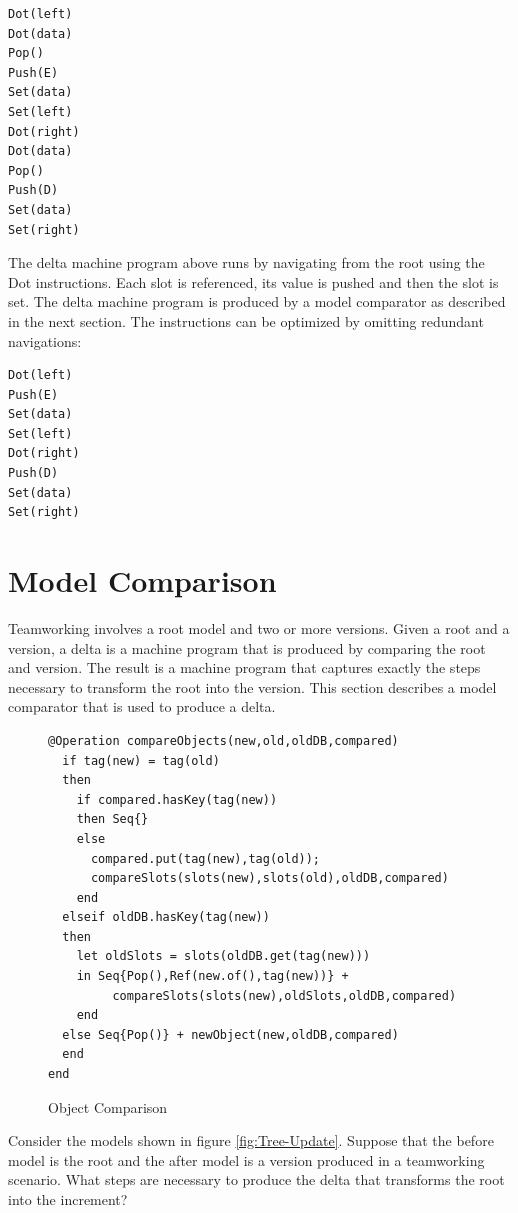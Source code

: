 \begin{lstlisting}
Dot(left)
Dot(data)
Pop()
Push(E)
Set(data)
Set(left)
Dot(right)
Dot(data)
Pop()
Push(D)
Set(data)
Set(right)
\end{lstlisting}The delta machine program above runs by navigating from the root using
the Dot instructions. Each slot is referenced, its value is pushed
and then the slot is set. The delta machine program is produced by
a model comparator as described in the next section. The instructions
can be optimized by omitting redundant navigations:

\begin{lstlisting}
Dot(left)
Push(E)
Set(data)
Set(left)
Dot(right)
Push(D)
Set(data)
Set(right)
\end{lstlisting}
\section{Model Comparison}

Teamworking involves a root model and two or more versions. Given
a root and a version, a delta is a machine program that is produced
by comparing the root and version. The result is a machine program
that captures exactly the steps necessary to transform the root into
the version. This section describes a model comparator that is used
to produce a delta.

%
\begin{figure}
\hfill{}\begin{lstlisting}
@Operation compareObjects(new,old,oldDB,compared)
  if tag(new) = tag(old)
  then 
    if compared.hasKey(tag(new)) 
    then Seq{}
    else 
      compared.put(tag(new),tag(old));
      compareSlots(slots(new),slots(old),oldDB,compared)
    end
  elseif oldDB.hasKey(tag(new))
  then 
    let oldSlots = slots(oldDB.get(tag(new)))
    in Seq{Pop(),Ref(new.of(),tag(new))} + 
         compareSlots(slots(new),oldSlots,oldDB,compared)
    end
  else Seq{Pop()} + newObject(new,oldDB,compared)
  end
end
\end{lstlisting}\hfill{}

\caption{Object Comparison\label{fig:Object-Comparison}}

\end{figure}


Consider the models shown in figure \ref{fig:Tree-Update}. Suppose
that the before model is the root and the after model is a version
produced in a teamworking scenario. What steps are necessary to produce
the delta that transforms the root into the increment?

